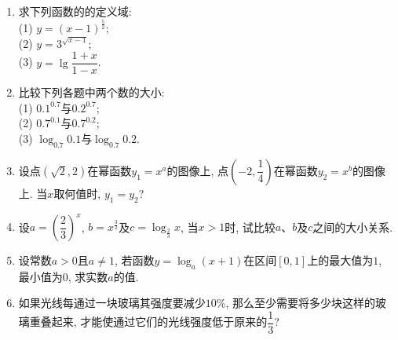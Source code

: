 \documentclass[10pt,a4paper]{article}
\begin{document}
\begin{enumerate}[1.]
{}{
}
\vspace*{3cm}
\item 求下列函数的的定义域:\\
(1) $y=(x-1)^{\frac 52}$;\\
(2) $y=3^{\sqrt{x-1}}$;\\
(3) $y=\lg \dfrac{1+x}{1-x}$.
\vspace*{3cm}
\item 比较下列各题中两个数的大小:\\
(1) $0.1^{0.7}$与$0.2^{0.7}$;\\
(2) $0.7^{0.1}$与$0.7^{0.2}$;\\
(3) $\log_{0.7}0.1$与$\log_{0.7}0.2$.
\vspace*{3cm}
\item 设点$(\sqrt 2, 2)$在幂函数$y_1=x^a$的图像上, 点$(-2,\dfrac 14)$在幂函数$y_2=x^b$的图像上. 当$x$取何值时, $y_1=y_2$?
\vspace*{3cm}
\item 设$a=(\dfrac 23)^x$, $b=x^{\frac 32}$及$c=\log_\frac{2}{3}x$, 当$x>1$时, 试比较$a$、$b$及$c$之间的大小关系.
\vspace*{3cm}
\item 设常数$a>0$且$a\ne 1$, 若函数$y=\log_a(x+1)$在区间$[0, 1]$上的最大值为$1$, 最小值为$0$, 求实数$a$的值.
\vspace*{3cm}
\item 如果光线每通过一块玻璃其强度要减少$10\%$, 那么至少需要将多少块这样的玻璃重叠起来, 才能使通过它们的光线强度低于原来的$\dfrac 13$? 
\vspace*{3cm}
\end{enumerate}
\end{document}
